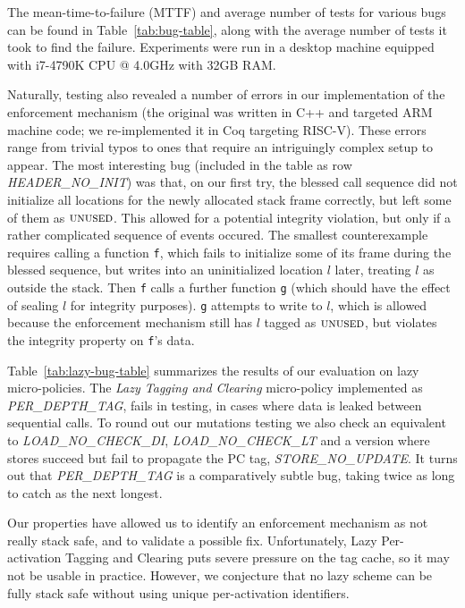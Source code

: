 \documentclass[10pt,conference]{ieeetran}%
\theoremstyle{definition}
\begin{document}
{The mean-time-to-failure (MTTF) and average number of tests for various bugs can be found in
Table~\ref{tab:bug-table}, along with the average number of tests
it took to find the failure. Experiments were run in a desktop
machine equipped with i7-4790K CPU @ 4.0GHz with 32GB RAM.

Naturally, testing also revealed a number of errors in our
implementation of the enforcement mechanism (the original was written in C++
and targeted ARM machine code;
we re-implemented it in Coq targeting RISC-V).  These errors range
from trivial typos to ones that require an intriguingly complex setup
to appear.  The most interesting bug (included in the table as row
{\em HEADER\_NO\_INIT}) was that, on our first try, the blessed call
sequence %
did not initialize all locations for the
newly allocated stack frame correctly, but left some of them as
$\textsc{unused}$. This allowed for a potential integrity violation, but
only if a rather complicated sequence of events occured.
The smallest counterexample requires calling a function {\tt f},
which fails to initialize some of its frame during the blessed sequence,
but writes into an uninitialized location $l$ later, treating \(l\) as outside
the stack. Then {\tt f} calls a further function {\tt g} (which should have
the effect of sealing $l$ for integrity purposes). {\tt g} attempts to write to $l$,
which is allowed because the enforcement mechanism still has
$l$ tagged as $\textsc{unused}$, but violates the integrity property on {\tt f}'s data.

Table~\ref{tab:lazy-bug-table} summarizes the results of our evaluation on lazy micro-policies.
The {\em Lazy Tagging and Clearing} micro-policy implemented as {\em PER\_DEPTH\_TAG},
fails in testing, in cases where data is leaked between sequential calls.
To round out our mutations testing
we also check an equivalent to {\em LOAD\_NO\_CHECK\_DI}, {\em LOAD\_NO\_CHECK\_LT}
and a version where stores succeed but fail to propagate the PC tag, {\em STORE\_NO\_UPDATE}.
It turns out that {\em PER\_DEPTH\_TAG} is a comparatively subtle bug,
taking twice as long to catch as the next longest.

Our properties have allowed us to identify an enforcement mechanism as
not really stack safe, and to validate a possible fix.
Unfortunately, Lazy Per-activation Tagging and Clearing
puts severe pressure on the tag cache, so it may not be usable in practice.
However, we conjecture that no lazy scheme can be fully stack safe
without using unique per-activation identifiers.

}
\end{document}
